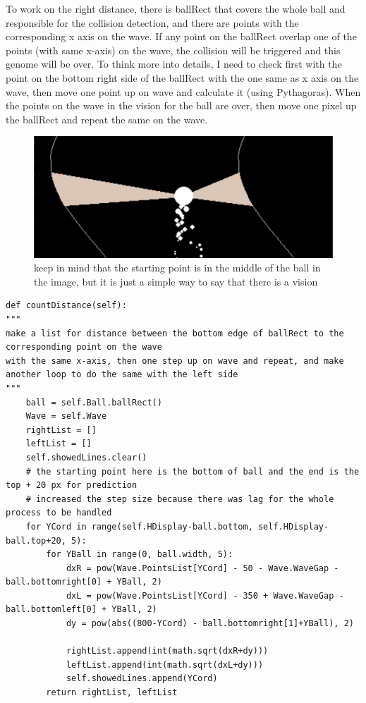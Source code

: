 To work on the right distance, there is ballRect that covers the whole ball and responsible for the collision detection, and there are points with the corresponding x axis on the wave. If any point on the ballRect overlap one of the points (with same x-axis) on the wave, the collision will be triggered and this genome will be over. To think more into details, I need to check first with the point on the bottom right side of the ballRect with the one same as x axis on the wave, then move one point up on wave and calculate it (using Pythagoras). When the points on the wave in the vision for the ball are over, then move one pixel up the ballRect and repeat the same on the wave.
\begin{figure}[H]
	\centering
	\includegraphics[width=0.7\linewidth]{"usedImages/vision 576 lines"}
	\caption{keep in mind that the starting point is in the middle of the ball in the image, but it is just a simple way to say that there is a vision}
	\label{fig:vision-576-lines}
\end{figure}

\begin{listing}
	\begin{verbatim}
def countDistance(self):
"""
make a list for distance between the bottom edge of ballRect to the corresponding point on the wave 
with the same x-axis, then one step up on wave and repeat, and make another loop to do the same with the left side
"""
	ball = self.Ball.ballRect()
	Wave = self.Wave
	rightList = []
	leftList = []
	self.showedLines.clear()
	# the starting point here is the bottom of ball and the end is the top + 20 px for prediction
	# increased the step size because there was lag for the whole process to be handled
	for YCord in range(self.HDisplay-ball.bottom, self.HDisplay-ball.top+20, 5):
		for YBall in range(0, ball.width, 5):
			dxR = pow(Wave.PointsList[YCord] - 50 - Wave.WaveGap - ball.bottomright[0] + YBall, 2)
			dxL = pow(Wave.PointsList[YCord] - 350 + Wave.WaveGap - ball.bottomleft[0] + YBall, 2)
			dy = pow(abs((800-YCord) - ball.bottomright[1]+YBall), 2)

			rightList.append(int(math.sqrt(dxR+dy)))
			leftList.append(int(math.sqrt(dxL+dy)))
			self.showedLines.append(YCord)
		return rightList, leftList
	\end{verbatim}
\end{listing}

